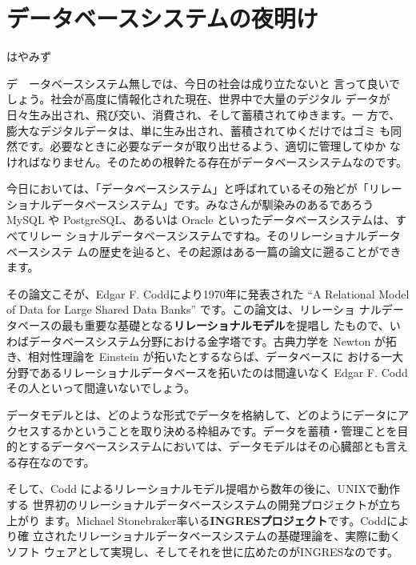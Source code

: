 

\cleardoublepage
\plainifnotempty


\chapter{データベースシステムの夜明け}


\begin{flushright}
はやみず
\end{flushright}


\lettrine{デ} \ \ ータベースシステム無しでは、今日の社会は成り立たないと
言って良いでしょう。社会が高度に情報化された現在、世界中で大量のデジタル
データが日々生み出され、飛び交い、消費され、そして蓄積されてゆきます。一
方で、膨大なデジタルデータは、単に生み出され、蓄積されてゆくだけではゴミ
も同然です。必要なときに必要なデータが取り出せるよう、適切に管理してゆか
なければなりません。そのための根幹たる存在がデータベースシステムなのです。


今日においては、「データベースシステム」と呼ばれているその殆どが「リレー
ショナルデータベースシステム」です。みなさんが馴染みのあるであろう MySQL
や PostgreSQL、あるいは Oracle といったデータベースシステムは、すべてリレー
ショナルデータベースシステムですね。そのリレーショナルデータベースシステ
ムの歴史を辿ると、その起源はある一篇の論文に遡ることができます。


その論文こそが、Edgar F.  Coddにより1970年に発表された ``A Relational
Model of Data for Large Shared Data Banks'' です。この論文は、リレーショ
ナルデータベースの最も重要な基礎となる{\bf リレーショナルモデル}を提唱し
たもので、いわばデータベースシステム分野における金字塔です。古典力学を
Newton が拓き、相対性理論を Einstein が拓いたとするならば、データベースに
おける一大分野であるリレーショナルデータベースを拓いたのは間違いなく
Edgar F. Codd その人といって間違いないでしょう。


データモデルとは、どのような形式でデータを格納して、どのようにデータにア
クセスするかということを取り決める枠組みです。データを蓄積・管理ことを目
的とするデータベースシステムにおいては、データモデルはその心臓部とも言え
る存在なのです。


そして、Codd によるリレーショナルモデル提唱から数年の後に、UNIXで動作する
世界初のリレーショナルデータベースシステムの開発プロジェクトが立ち上がり
ます。Michael Stonebraker率いる{\bf INGRESプロジェクト}です。Coddにより確
立されたリレーショナルデータベースシステムの基礎理論を、実際に動くソフト
ウェアとして実現し、そしてそれを世に広めたのがINGRESなのです。


